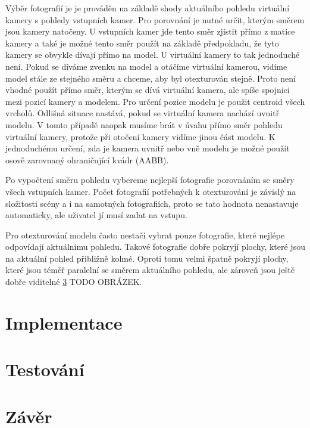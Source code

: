 \documentclass[11pt,twoside,a4paper]{book}
\begin{document}
Výběr fotografií je je prováděn na základě shody aktuálního pohledu virtuální kamery s pohledy vstupních kamer. Pro porovnání je nutné určit, kterým směrem jsou kamery natočeny.  U vstupních kamer jde tento směr zjistit přímo z matice kamery a také je možné tento směr použít na základě předpokladu, že tyto kamery se obvykle dívají přímo na model. U virtuální kamery to tak jednoduché není. Pokud se díváme zvenku na model a otáčíme virtuální kamerou, vidíme model stále ze stejného směru a chceme, aby byl otexturován stejně. Proto není vhodné použít přímo směr, kterým se dívá virtuální kamera, ale spíše spojnici mezi pozicí kamery a modelem. Pro určení pozice modelu je použit centroid všech vrcholů. Odlišná situace nastává, pokud se virtuální kamera nachází uvnitř modelu. V tomto případě naopak musíme brát v úvahu přímo směr pohledu virtuální kamery, protože při otočení kamery vidíme jinou část modelu. K jednoduchému určení, zda je kamera uvnitř nebo vně modelu je možné použít osově zarovnaný ohraničující kvádr (AABB).

Po vypočtení směru pohledu vybereme nejlepší fotografie porovnáním se směry všech vstupních kamer. Počet fotografií potřebných k otexturování je závislý na složitosti scény a i na samotných fotografiích, proto se tato hodnota nenastavuje automaticky, ale uživatel jí musí zadat na vstupu.

Pro otexturování modelu často nestačí vybrat pouze fotografie, které nejlépe odpovídají aktuálnímu pohledu. Takové fotografie dobře pokryjí plochy, které jsou na aktuální pohled přibližně kolmé. Oproti tomu velmi špatně pokryjí plochy, které jsou téměř paralelní se směrem aktuálního pohledu, ale zároveň jsou ještě dobře viditelné \ref{} TODO OBRÁZEK.





\chapter{Implementace}

\chapter{Testování}

\chapter{Závěr}


\renewcommand\refname{Zdroje}

\def\CS{$\cal C\kern-0.1667em\lower.5ex\hbox{$\cal S$}\kern-0.075em $}

\end{document}
